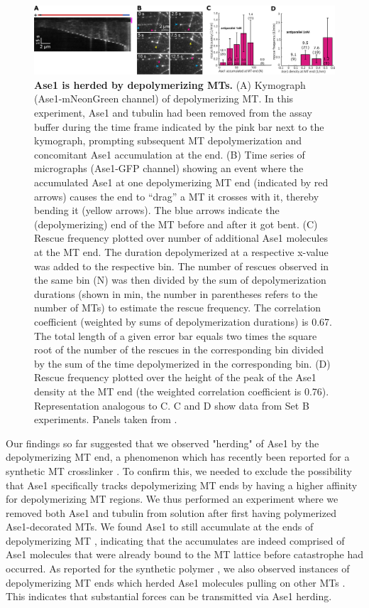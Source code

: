 \begin{figure}[h]
    \centering
    \includegraphics[width=1\linewidth]{Figures/ase2c.png}
    \caption[Ase1 is herded by depolymerizing MTs.]{\textbf{Ase1 is herded by depolymerizing MTs.}
    (A) Kymograph (Ase1-mNeonGreen channel) of depolymerizing MT. In this experiment, Ase1 and tubulin had been removed from the assay buffer during the time frame indicated by the pink bar next to the kymograph, prompting subsequent MT depolymerization and concomitant Ase1 accumulation at the end. (B) Time series of micrographs (Ase1-GFP channel) showing an event where the accumulated Ase1 at one depolymerizing MT end (indicated by red arrows) causes the end to “drag” a MT it crosses with it, thereby bending it (yellow arrows). The blue arrows indicate the (depolymerizing) end of the MT before and after it got bent. (C) Rescue frequency plotted over number of additional Ase1 molecules at the MT end. The duration depolymerized at a respective x-value was added to the respective bin. The number of rescues observed in the same bin (N) was then divided by the sum of depolymerization durations (shown in min, the number in parentheses refers to the number of MTs) to estimate the rescue frequency. The correlation coefficient (weighted \parencite{Pelletier2024} by sums of depolymerization durations) is 0.67. The total length of a given error bar equals two times the square root of the number of the rescues in the corresponding bin divided by the sum of the time depolymerized in the corresponding bin. (D) Rescue frequency plotted over the height of the peak of the Ase1 density at the MT end (the weighted correlation coefficient is 0.76). Representation analogous to C. C and D show data from Set B experiments. Panels taken from \cite{Krattenmacher2024}.
        }\label{ase2c}
\end{figure}

Our findings so far suggested that we observed "herding" of Ase1 by the depolymerizing MT end, a phenomenon which has recently been reported for a synthetic MT crosslinker \parencite{Drechsler2019}. To confirm this, we needed to exclude the possibility that Ase1 specifically tracks depolymerizing MT ends by having a higher affinity for depolymerizing MT regions. We thus performed an experiment where we removed both Ase1 and tubulin from solution after first having polymerized Ase1-decorated MTs. We found Ase1 to still accumulate at the ends of depolymerizing MT , indicating that the accumulates are indeed comprised of Ase1 molecules that were already bound to the MT lattice before catastrophe had occurred. As reported for the synthetic polymer \parencite{Drechsler2019}, we also observed instances of depolymerizing MT ends which herded Ase1 molecules pulling on other MTs . This indicates that substantial forces can be transmitted via Ase1 herding.\par

